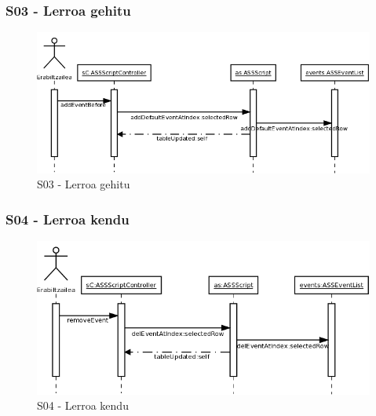 \subsubsection{S03 - Lerroa gehitu}
\begin{figure}[htp]
\begin{center}
\includegraphics[scale=0.35]{Pictures/Chapter4/Diseinua/S03.png}
\caption{S03 - Lerroa gehitu}
\label{s03d}
\end{center}
\end{figure}

\newpage
\subsubsection{S04 - Lerroa kendu}
\begin{figure}[htp]
\begin{center}
\includegraphics[scale=0.35]{Pictures/Chapter4/Diseinua/S04.png}
\caption{S04 - Lerroa kendu}
\label{s04d}
\end{center}
\end{figure}


